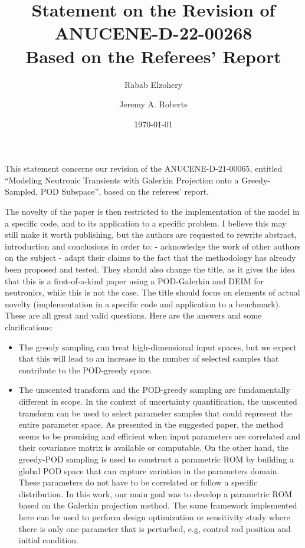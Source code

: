 \documentclass[10pt]{article}
\title{Statement on the Revision of ANUCENE-D-22-00268 \\
  Based on the Referees' Report}
\author{Rabab Elzohery \and Jeremy A. Roberts}
\date{\today}
\begin{document}
This statement concerns our revision of the ANUCENE-D-21-00065, entitled ``Modeling Neutronic Transients with Galerkin Projection onto a Greedy-Sampled, POD Subspace'', based on the referees' report.


\begin{response}{
   The novelty of the paper is then restricted to the implementation of the model in a specific code, and to its application to a specific problem. I believe this may still make it worth publishing, but the authors are requested to rewrite abstract, introduction and conclusions in order to:
   - acknowledge the work of other authors on the subject
   - adapt their claims to the fact that the methodology has already been proposed and tested.
   They should also change the title, as it gives the idea that this is a first-of-a-kind paper using a POD-Galerkin and DEIM for neutronics, while this is not the case. The title should focus on elements of actual novelty (implementation in a specific code and application to a benchmark).
}
  These are all great and valid questions. Here are the answers and some clarifications:
  \begin{itemize}
  \item{The greedy sampling can treat high-dimensional input spaces,  but we expect that this will lead to an increase in the number of selected samples that contribute to the POD-greedy space.}
  
 \item{The unscented transform and the POD-greedy sampling are fundamentally different in scope.
  In the context of uncertainty quantification, the unscented transform can be used to select parameter samples that could represent the entire parameter space.
  As presented in the suggested paper,  the method seems to be promising and efficient when input  parameters are correlated and their covariance matrix is available or computable.
  On the other hand, the greedy-POD sampling is used to construct a parametric ROM by building  a global POD space that can capture variation in the parameters domain. These  parameters do not have to be correlated or follow a specific distribution. 
  In this work, our main goal  was to develop a parametric ROM based on the Galerkin projection method. The same framework implemented here can be used to perform design optimization or sensitivity study where  there is only one parameter that is perturbed,  e.g, control rod position and  initial condition.
  
}
\end{itemize}
\end{response}
\end{document}
